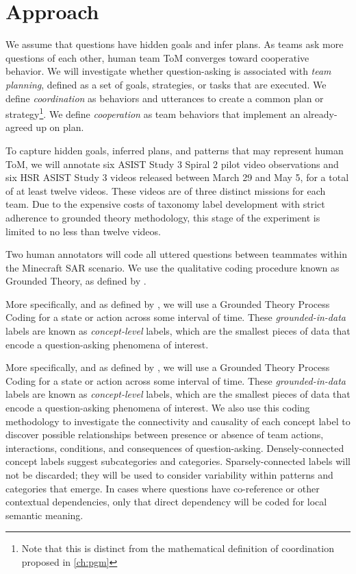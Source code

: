 \section{Approach}

We assume that questions have hidden goals and infer plans. As teams ask more
questions of each other, human team ToM converges toward cooperative behavior.
We will investigate whether question-asking is associated with \emph{team
planning}, defined as a set of goals, strategies, or tasks that are executed.
We define \emph{coordination} as behaviors and utterances to create a common
plan or strategy\footnote{Note that this is distinct from the mathematical
definition of coordination proposed in \autoref{ch:pgm}}. We define
\emph{cooperation} as team behaviors that implement an already-agreed up on
plan.

To capture hidden goals, inferred plans, and patterns that may represent human
ToM, we will annotate six ASIST Study 3 Spiral 2 pilot video observations and
six HSR ASIST Study 3 videos released between March 29 and May 5, for a total
of at least twelve videos. These videos are of three distinct missions for each
team. Due to the expensive costs of taxonomy label development with strict
adherence to grounded theory methodology, this stage of the experiment is
limited to no less than twelve videos. 

Two human annotators will code all uttered questions between teammates within
the Minecraft SAR scenario.  We use the qualitative coding procedure known as
Grounded Theory, as defined by \citet{corbin_strauss_2015}. 

More specifically, and as defined by \citet{saldana_2021}, we will use a
Grounded Theory Process Coding for a state or action across some interval of
time. These \emph{grounded-in-data} labels are known as \emph{concept-level}
labels, which are the smallest pieces of data that encode a question-asking
phenomena of interest.

More specifically, and as defined by \citet{saldana_2021}, we will use a
Grounded Theory Process Coding for a state or action across some interval of
time. These \emph{grounded-in-data} labels are known as \emph{concept-level}
labels, which are the smallest pieces of data that encode a question-asking
phenomena of interest. We also use this coding methodology to investigate the connectivity and
causality of each concept label to discover possible relationships between
presence or absence of team actions, interactions, conditions, and consequences
of question-asking. Densely-connected concept labels suggest subcategories and
categories. Sparsely-connected labels will not be discarded; they will be used
to consider variability within patterns and categories that emerge. In cases
where questions have co-reference or other contextual dependencies, only that
direct dependency will be coded for local semantic meaning.

